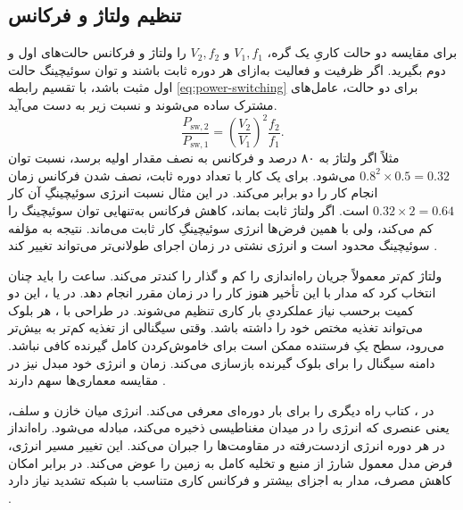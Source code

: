 \subsection{تنظیم ولتاژ و فرکانس}
\label{sec:power-voltage-frequency}

برای مقایسه دو حالت کاریِ یک گره، \(V_1,f_1\) و \(V_2,f_2\)
را ولتاژ و فرکانس حالت‌های اول و دوم بگیرید. اگر ظرفیت و فعالیت
به‌ازای هر دوره ثابت باشند و توان سوئیچینگ حالت اول مثبت باشد، با
تقسیم رابطه \eqref{eq:power-switching} برای دو حالت، عامل‌های مشترک
ساده می‌شوند و نسبت زیر به دست می‌آید.
\begin{equation}
  \frac{P_{\mathrm{sw},2}}{P_{\mathrm{sw},1}}
    =\left(\frac{V_2}{V_1}\right)^2\frac{f_2}{f_1}.
  \label{eq:power-voltage-frequency-ratio}
\end{equation}
مثلاً اگر ولتاژ به ۸۰ درصد و فرکانس به نصف مقدار اولیه برسد، نسبت
توان \(0.8^2\times0.5=0.32\) می‌شود. برای یک کار با تعداد دوره
ثابت، نصف شدن فرکانس زمان انجام کار را دو برابر می‌کند. در این مثال
نسبت انرژی سوئیچینگِ آن کار \(0.32\times2=0.64\) است. اگر ولتاژ
ثابت بماند، کاهش فرکانس به‌تنهایی توان سوئیچینگ را کم می‌کند، ولی
با همین فرض‌ها انرژی سوئیچینگِ کار ثابت می‌ماند. نتیجه به مؤلفه
سوئیچینگ محدود است و انرژی نشتی در زمان اجرای طولانی‌تر می‌تواند
تغییر کند \cite[بخش‌های  و ،
صفحات ۱۹۰ تا ۱۹۳]{weste}.

ولتاژ کم‌تر معمولاً جریان راه‌اندازی را کم و گذار را کندتر می‌کند.
ساعت را باید چنان انتخاب کرد که مدار با این تأخیر هنوز کار را در
زمان مقرر انجام دهد. در 
یا ، این دو کمیت برحسب نیاز عملکردیِ بار کاری تنظیم
می‌شوند. در طراحی با ، هر بلوک می‌تواند تغذیه
مختص خود را داشته باشد. وقتی سیگنالی از تغذیه کم‌تر به بیش‌تر می‌رود،
سطح یکِ فرستنده ممکن است برای خاموش‌کردن کامل  گیرنده
کافی نباشد.  دامنه سیگنال را برای بلوک گیرنده
بازسازی می‌کند. زمان و انرژی خود مبدل نیز در مقایسه معماری‌ها سهم
دارند \cite[بخش ، صفحات ۱۹۰ تا ۱۹۲]{weste}
\cite[اسلاید ۱۹]{powerslides}.

در ، کتاب راه دیگری را برای بار دوره‌ای معرفی
می‌کند. انرژی میان خازن و سلف، یعنی عنصری که انرژی را در میدان
مغناطیسی ذخیره می‌کند، مبادله می‌شود. راه‌انداز در هر دوره انرژی
ازدست‌رفته در مقاومت‌ها را جبران می‌کند. این تغییر مسیر انرژی، فرض
مدل معمول شارژ از منبع و تخلیه کامل به زمین را عوض می‌کند. در برابر
امکان کاهش مصرف، مدار به اجزای بیشتر و فرکانس کاری متناسب با
شبکه تشدید نیاز دارد \cite[بخش ، صفحه ۱۹۳]{weste}.
